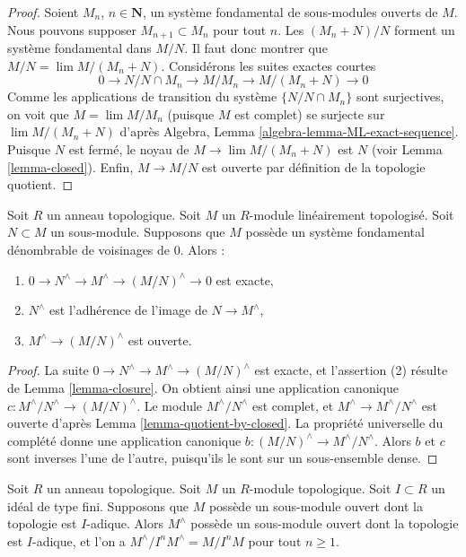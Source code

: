 \begin{proof}
Soient $M_n$, $n \in \mathbf{N}$, un système fondamental de sous-modules ouverts de $M$.
Nous pouvons supposer $M_{n + 1} \subset M_n$
pour tout $n$. Les $(M_n + N)/N$ forment un système fondamental dans $M/N$.
Il faut donc montrer que $M/N = \lim M/(M_n + N)$. Considérons
les suites exactes courtes
$$
0 \to N/N \cap M_n \to M/M_n \to M/(M_n + N) \to 0
$$
Comme les applications de transition du système $\{N/N\cap M_n\}$ sont surjectives,
on voit que $M = \lim M/M_n$ (puisque $M$ est complet) se surjecte sur
$\lim M/(M_n + N)$ d'après
Algebra, Lemma \ref{algebra-lemma-ML-exact-sequence}.
Puisque $N$ est fermé, le noyau de $M \to \lim M/(M_n + N)$
est $N$ (voir Lemma \ref{lemma-closed}). Enfin, $M \to M/N$
est ouverte par définition de la topologie quotient.
\end{proof}

\begin{lemma}
\label{lemma-ses}
\begin{reference}
\cite[Theorem 8.1]{Ma}
\end{reference}
Soit $R$ un anneau topologique. Soit $M$ un $R$-module linéairement
topologisé. Soit $N \subset M$ un sous-module. Supposons que $M$ possède un
système fondamental dénombrable de voisinages de $0$. Alors :
\begin{enumerate}
\item $0 \to N^\wedge \to M^\wedge \to (M/N)^\wedge \to 0$ est exacte,
\item $N^\wedge$ est l'adhérence de l'image de $N \to M^\wedge$,
\item $M^\wedge \to (M/N)^\wedge$ est ouverte.
\end{enumerate}
\end{lemma}

\begin{proof}
La suite $0 \to N^\wedge \to M^\wedge \to (M/N)^\wedge$ est exacte,
et l'assertion (2) résulte de Lemma \ref{lemma-closure}.
On obtient ainsi une application canonique $c : M^\wedge/N^\wedge \to (M/N)^\wedge$.
Le module $M^\wedge/N^\wedge$ est complet, et
$M^\wedge \to M^\wedge/N^\wedge$ est ouverte d'après
Lemma \ref{lemma-quotient-by-closed}.
La propriété universelle du complété donne une application canonique
$b : (M/N)^\wedge \to M^\wedge/N^\wedge$.
Alors $b$ et $c$ sont inverses l'une de l'autre, puisqu'ils le sont sur un sous-ensemble dense.
\end{proof}

\begin{lemma}
\label{lemma-completion-adic-star}
Soit $R$ un anneau topologique. Soit $M$ un $R$-module topologique.
Soit $I \subset R$ un idéal de type fini. Supposons que $M$
possède un sous-module ouvert dont la topologie est $I$-adique. Alors $M^\wedge$
possède un sous-module ouvert dont la topologie est $I$-adique, et l'on a
$M^\wedge/I^n M^\wedge = M/I^nM$ pour tout $n \geq 1$.
\end{lemma}

